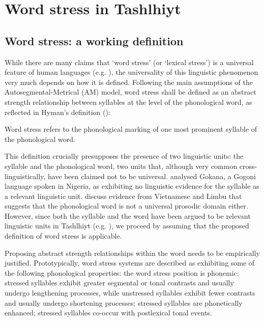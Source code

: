 \chapter{Word stress in Tashlhiyt}
\section{Word stress: a working definition}

While there are many claims that ‘word stress’ (or ‘lexical stress’) is a universal feature of human languages (e.g. \citealt{GoedemansVanderHulst2009}), the universality of this linguistic phenomenon very much depends on how it is defined. Following the main assumptions of the Autosegmental-Metrical (AM) model, word stress shall be defined as an abstract strength relationship between syllables at the level of the phonological word, as reflected in Hyman’s definition (\citealt{Hyman2014}):

\begin{exe}
\ex\label{ex:4:1} Word stress refers to the phonological marking of one most prominent syllable of the phonological word.
\end{exe}

This definition crucially presupposes the presence of two linguistic units: the syllable and the phonological word, two units that, although very common cross-linguistically, have been claimed not to be universal. \citet{Hyman2011} analysed Gokana, a Gogoni language spoken in Nigeria, as exhibiting no linguistic evidence for the syllable as a relevant linguistic unit. \citet{Schiering.etal2010} discuss evidence from Vietnamese and Limbu that suggests that the phonological word is not a universal prosodic domain either. However, since both the syllable and the word have been argued to be relevant linguistic units in Tashlhiyt (e.g. \citealt{DE2002,Ridouane2008}), we proceed by assuming that the proposed definition of word stress is applicable.

Proposing abstract strength relationships within the word needs to be empirically justified. Prototypically, word stress systems are described as exhibiting some of the following phonological properties: the word stress position is phonemic; stressed syllables exhibit greater segmental or tonal contrasts and usually undergo lengthening processes, while unstressed syllables exhibit fewer contrasts and usually undergo shortening processes; stressed syllables are phonetically enhanced; stressed syllables co-occur with postlexical tonal events.

